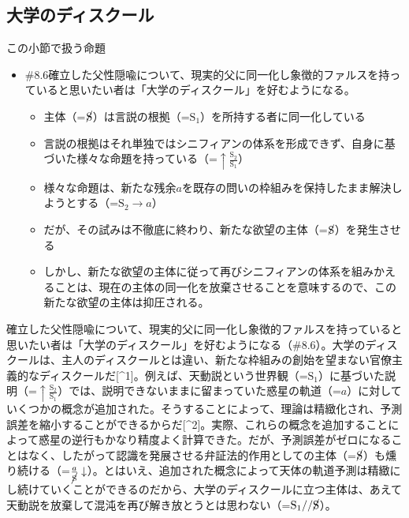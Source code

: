 \subsection{大学のディスクール}\label{ux5927ux5b66ux306eux30c7ux30a3ux30b9ux30afux30fcux30eb}

\begin{note}{この小節で扱う命題}
  \begin{itemize}
    \tightlist
    \item{\#8.6}確立した父性隠喩について、現実的父に同一化し象徴的ファルスを持っていると思いたい者は「大学のディスクール」を好むようになる。
      \begin{itemize}
        \tightlist
        \item 主体（=$\cancel{\textrm{S}}$）は言説の根拠（=$\textrm{S}_1$）を所持する者に同一化している
        \item 言説の根拠はそれ単独ではシニフィアンの体系を形成できず、自身に基づいた様々な命題を持っている（=$\uparrow\frac{\textrm{S}_2}{\textrm{S}_1}$）
        \item 様々な命題は、新たな残余$a$を既存の問いの枠組みを保持したまま解決しようとする（=$\textrm{S}_2\rightarrow a$）
        \item だが、その試みは不徹底に終わり、新たな欲望の主体（=$\cancel{\textrm{S}}$）を発生させる
        \item しかし、新たな欲望の主体に従って再びシニフィアンの体系を組みかえることは、現在の主体の同一化を放棄させることを意味するので、この新たな欲望の主体は抑圧される。
      \end{itemize}
  \end{itemize}
\end{note}

確立した父性隠喩について、現実的父に同一化し象徴的ファルスを持っていると思いたい者は「大学のディスクール」を好むようになる（\#8.6）。大学のディスクールは、主人のディスクールとは違い、新たな枠組みの創始を望まない官僚主義的なディスクールだ{[}\^{}1{]}。例えば、天動説という世界観（=\(\textrm{S}_1\)）に基づいた説明（=\(\uparrow\frac{\textrm{S}_2}{\textrm{S}_1}\)）では、説明できないままに留まっていた惑星の軌道（=\(a\)）に対していくつかの概念が追加された。そうすることによって、理論は精緻化され、予測誤差を縮小することができるからだ{[}\^{}2{]}。実際、これらの概念を追加することによって惑星の逆行もかなり精度よく計算できた。だが、予測誤差がゼロになることはなく、したがって認識を発展させる弁証法的作用としての主体（=\(\cancel{\textrm{S}}\)）も燻り続ける（=\(\frac{a}{\cancel{\textrm{S}}}\downarrow\)）。とはいえ、追加された概念によって天体の軌道予測は精緻にし続けていくことができるのだから、大学のディスクールに立つ主体は、あえて天動説を放棄して混沌を再び解き放とうとは思わない（=\(\textrm{S}_1//\cancel{\textrm{S}}\)）。

